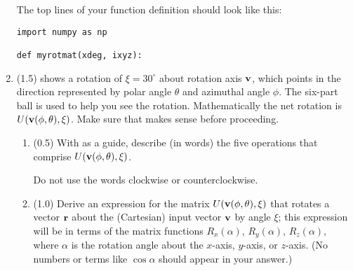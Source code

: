 \documentclass[11pt,titlepage,fleqn]{article}
\newcommand{\rotangA}{\alpha}
\newcommand{\rotangB}{\xi}    %
\newcommand{\rotvec}{\bv}      %
\newcommand{\Rmat}{R}
\newcommand{\Umat}{U}
\begin{document}
\begin{enumerate}
The top lines of your function definition should look like this:
%
\begin{verbatim}
import numpy as np

def myrotmat(xdeg, ixyz):
\end{verbatim}

\item (1.5)  shows a rotation of $\rotangB = 30^\circ$ about rotation axis $\rotvec$, which points in the direction represented by polar angle $\theta$ and azimuthal angle $\phi$. The six-part ball is used to help you see the rotation. Mathematically the net rotation is $\Umat(\rotvec(\phi,\theta),\rotangB)$. Make sure that  makes sense before proceeding.
%
\begin{enumerate}
\item (0.5) With  as a guide, describe (in words) the five operations that comprise $\Umat(\rotvec(\phi,\theta),\rotangB)$.

Do not use the words clockwise or counterclockwise.

\item (1.0) Derive an expression for the matrix $\Umat(\rotvec(\phi,\theta),\rotangB)$ that rotates a vector $\mbox{${\bf r}$}$ about the (Cartesian) input vector $\rotvec$ by angle $\rotangB$; this expression will be in terms of the matrix functions $\Rmat_x(\rotangA)$, $\Rmat_y(\rotangA)$, $\Rmat_z(\rotangA)$, where $\rotangA$ is the rotation angle about the $x$-axis, $y$-axis, or $z$-axis. (No numbers or terms like $\cos\rotangA$ should appear in your answer.)

\end{enumerate}


\end{enumerate}
\end{document}
